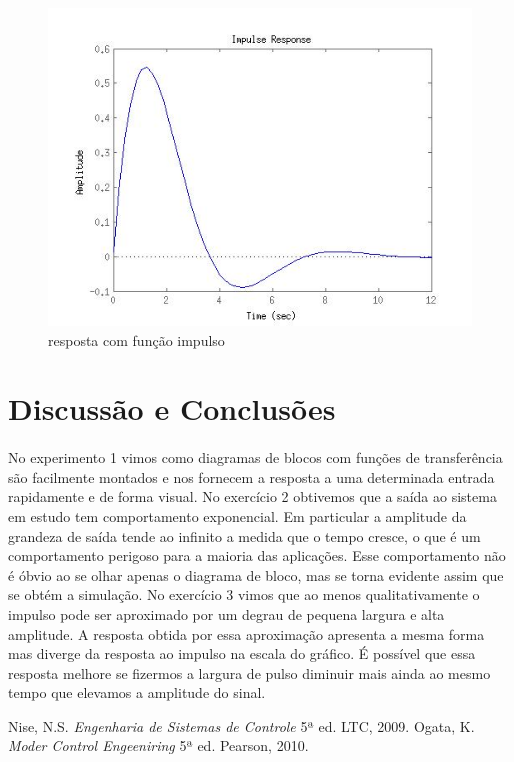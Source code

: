\documentclass[a4paper,11pt]{article}
\begin{document}
\begin{figure}[!htp]
		\centering
		\includegraphics[scale = 0.5]{./images/exerc3-saida-impulso-pro.jpg}
		\caption{resposta com função impulso}
		\label{fig:circuit3-impulso-pro}
\end{figure}
\FloatBarrier


 \newpage
\section{Discussão e Conclusões}
\paragraph{} No experimento 1 vimos como diagramas de blocos com
funções de transferência são facilmente montados e nos fornecem
a resposta a uma determinada entrada rapidamente e de forma
visual. No exercício 2 obtivemos que a saída ao sistema em estudo
tem comportamento exponencial. Em particular a amplitude da grandeza 
de saída tende ao infinito a medida que o tempo cresce, o que é um
comportamento perigoso para a maioria das aplicações. Esse comportamento
não é óbvio ao se olhar apenas o diagrama de bloco, mas se torna evidente
assim que se obtém a simulação. No exercício 3 vimos que ao menos qualitativamente
o impulso pode ser aproximado por um degrau de pequena largura e alta amplitude. 
A resposta obtida por essa aproximação apresenta a mesma forma
mas diverge da resposta ao impulso na escala do gráfico. É possível
que essa resposta melhore se fizermos a largura de pulso diminuir 
mais ainda ao mesmo tempo que elevamos a amplitude do sinal.
\begin{thebibliography}{9}    
  		Nise, N.S.
  		\emph{Engenharia de Sistemas de Controle}
 		 5ª ed.
		LTC, 2009.
  		Ogata, K.
  		\emph{Moder Control Engeeniring}
 		 5ª ed.
		Pearson, 2010.
	 
\end{thebibliography}
\end{document}
